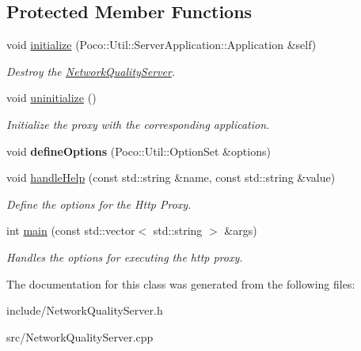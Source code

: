 \subsection*{Protected Member Functions}
\begin{DoxyCompactItemize}
\item 
\mbox{\label{classecodtn_1_1net_1_1NetworkQualityServer_ad712bf5eb17bed4867b4c3e4b6a5187c}} 
void \hyperlink{classecodtn_1_1net_1_1NetworkQualityServer_ad712bf5eb17bed4867b4c3e4b6a5187c}{initialize} (Poco\+::\+Util\+::\+Server\+Application\+::\+Application \&self)
\begin{DoxyCompactList}\small\item\em Destroy the \hyperlink{classecodtn_1_1net_1_1NetworkQualityServer}{Network\+Quality\+Server}. \end{DoxyCompactList}\item 
\mbox{\label{classecodtn_1_1net_1_1NetworkQualityServer_afb0f3220cf9392fb11ab7b83b633dc31}} 
void \hyperlink{classecodtn_1_1net_1_1NetworkQualityServer_afb0f3220cf9392fb11ab7b83b633dc31}{uninitialize} ()
\begin{DoxyCompactList}\small\item\em Initialize the proxy with the corresponding application. \end{DoxyCompactList}\item 
\mbox{\label{classecodtn_1_1net_1_1NetworkQualityServer_ac91e7628308d45a158656c25ea3238f8}} 
void {\bfseries define\+Options} (Poco\+::\+Util\+::\+Option\+Set \&options)
\item 
\mbox{\label{classecodtn_1_1net_1_1NetworkQualityServer_a01622b529cc2378ec8161dadfb232cbf}} 
void \hyperlink{classecodtn_1_1net_1_1NetworkQualityServer_a01622b529cc2378ec8161dadfb232cbf}{handle\+Help} (const std\+::string \&name, const std\+::string \&value)
\begin{DoxyCompactList}\small\item\em Define the options for the Http Proxy. \end{DoxyCompactList}\item 
\mbox{\label{classecodtn_1_1net_1_1NetworkQualityServer_ae88b7578f8643c372003b12b1514ba5d}} 
int \hyperlink{classecodtn_1_1net_1_1NetworkQualityServer_ae88b7578f8643c372003b12b1514ba5d}{main} (const std\+::vector$<$ std\+::string $>$ \&args)
\begin{DoxyCompactList}\small\item\em Handles the options for executing the http proxy. \end{DoxyCompactList}\end{DoxyCompactItemize}


The documentation for this class was generated from the following files\+:\begin{DoxyCompactItemize}
\item 
include/Network\+Quality\+Server.\+h\item 
src/Network\+Quality\+Server.\+cpp\end{DoxyCompactItemize}
